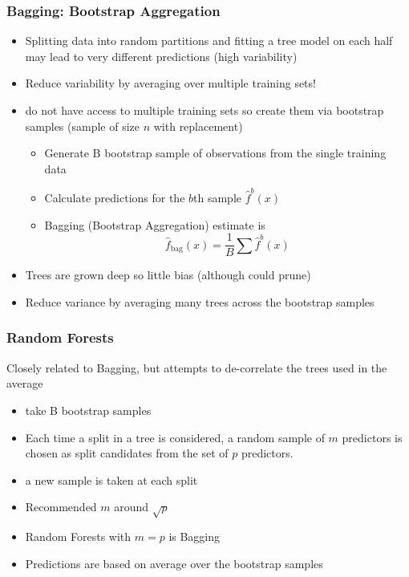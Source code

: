 \documentclass[]{beamer}\usepackage[]{graphicx}\usepackage[]{color}
\begin{document}
\begin{frame}  \frametitle{Bagging: Bootstrap Aggregation}
  \begin{itemize}
  \item Splitting data into random partitions and fitting a tree model on each half may lead to very different predictions (high variability) \pause
\item Reduce variability by averaging over multiple training sets! \pause
\item do not have access to multiple training sets so create them via bootstrap samples  (sample of size $n$ with replacement) \pause
  \begin{itemize}
  \item Generate B bootstrap sample of observations from the single training data \pause
  \item Calculate predictions for the $b$th sample $\hat{f}^{b}(x)$ \pause
  \item Bagging (Bootstrap Aggregation) estimate is
$$\hat{f}_{\text{bag}}(x) = \frac{1}{B} \sum \hat{f}^{b}(x)
$$
  \end{itemize}
\item Trees are grown deep  so little bias  (although could prune) \pause
 \item Reduce variance by averaging many trees across the bootstrap samples \pause
  \end{itemize}
\end{frame}



\begin{frame}
  \frametitle{Random Forests}
 Closely related to Bagging, but attempts to de-correlate the trees used in the average \pause
  \begin{itemize}
\item take B bootstrap samples  \pause
\item Each time a split in a tree is considered, a random sample of $m$ predictors is chosen as split candidates from the set of $p$ predictors.  \pause
\item a new sample is taken at each split  \pause
\item Recommended $m$  around $\sqrt{p}$  \pause
\item Random Forests with $m = p$ is Bagging  \pause
\item Predictions are based on average over the bootstrap samples  \pause
 \end{itemize}
\end{frame}
\end{document}
